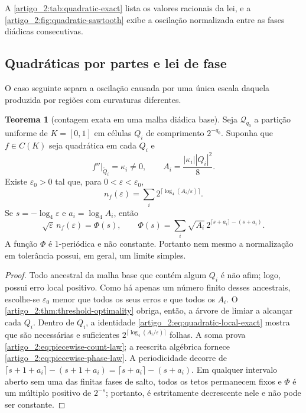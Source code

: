 \documentclass[12pt,a4paper]{article}
\theoremstyle{preciso}
\theoremstyle{definition}
\theoremstyle{preciso}
\newtheorem{theorem}[teorema]{Teorema}
\theoremstyle{preciso}
\theoremstyle{preciso}
\theoremstyle{preciso}
\theoremstyle{definition}
\theoremstyle{preciso}
\theoremstyle{definition}
\theoremstyle{preciso}
\theoremstyle{preciso}
\theoremstyle{definition}
\begin{document}
A \cref{artigo_2:tab:quadratic-exact} lista os valores racionais da lei, e a
\cref{artigo_2:fig:quadratic-sawtooth} exibe a oscilação normalizada entre as fases
diádicas consecutivas.

\subsection{Quadráticas por partes e lei de fase}

O caso seguinte separa a oscilação causada por uma única escala daquela
produzida por regiões com curvaturas diferentes.

\begin{theorem}[contagem exata em uma malha diádica base]\label{map:artigo_2:12.2}
\label{artigo_2:thm:piecewise-quadratic-count}
Seja $\mathcal Q_{q_0}$ a partição uniforme de $K=[0,1]$ em células
$Q_i$ de comprimento $2^{-q_0}$. Suponha que $f\in C(K)$ seja quadrática
em cada $Q_i$ e
\[
 f''|_{\mathring Q_i}=\kappa_i\ne0,
 \qquad
 A_i=\frac{|\kappa_i||Q_i|^2}{8}.
\]
Existe $\varepsilon_0>0$ tal que, para
$0<\varepsilon<\varepsilon_0$,
\begin{equation}
 n_f(\varepsilon)
 =\sum_i2^{\lceil\log_4(A_i/\varepsilon)\rceil}.
 \label{artigo_2:eq:piecewise-count-law}
\end{equation}
Se $s=-\log_4\varepsilon$ e $a_i=\log_4A_i$, então
\begin{equation}
 \sqrt\varepsilon\,n_f(\varepsilon)
 =\Phi(s),
 \qquad
 \Phi(s)=\sum_i\sqrt{A_i}\,
 2^{\lceil s+a_i\rceil-(s+a_i)}.
 \label{artigo_2:eq:piecewise-phase-law}
\end{equation}
A função $\Phi$ é $1$-periódica e não constante. Portanto nem mesmo a
normalização em tolerância possui, em geral, um limite simples.
\end{theorem}

\begin{proof}
Todo ancestral da malha base que contém algum $Q_i$ é não afim; logo, possui
erro local positivo. Como há apenas um número finito desses ancestrais,
escolhe-se $\varepsilon_0$ menor que todos os seus erros e que todos os $A_i$.
O \cref{artigo_2:thm:threshold-optimality} obriga, então, a árvore de limiar a alcançar
cada $Q_i$. Dentro de $Q_i$, a identidade
\eqref{artigo_2:eq:quadratic-local-exact} mostra que são necessárias e suficientes
$2^{\lceil\log_4(A_i/\varepsilon)\rceil}$ folhas. A soma prova
\eqref{artigo_2:eq:piecewise-count-law}; a reescrita algébrica fornece
\eqref{artigo_2:eq:piecewise-phase-law}. A periodicidade decorre de
$\lceil s+1+a_i\rceil-(s+1+a_i)=\lceil s+a_i\rceil-(s+a_i)$.
Em qualquer intervalo aberto sem uma das finitas fases de salto, todos
os tetos permanecem fixos e $\Phi$ é um múltiplo positivo de $2^{-s}$;
portanto, é estritamente decrescente nele e não pode ser constante.
\end{proof}
\end{document}

